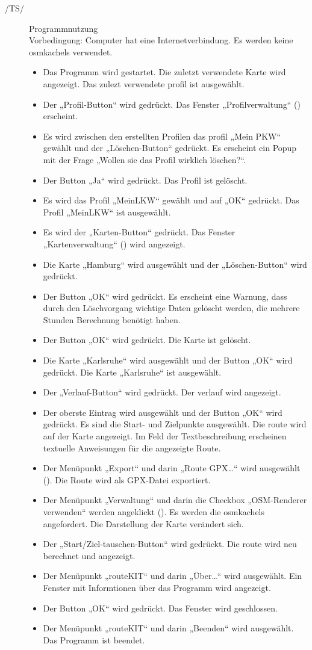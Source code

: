\documentclass[a4paper, 11pt]{article}
\makeatletter
\def\namedlabel#1#2{\begingroup
    #2%
    \def\@currentlabel{#2}%
    \phantomsection\label{#1}\endgroup
}
\newcommand{\oitem}[2]{
  \@ifundefined{c@oitem#1}{\newcounter{oitem#1}}{} %
  \addtocounter{oitem#1}{10}
  \item[\namedlabel{#1:#2}{/#1\arabic{oitem#1}/}]
}
\makeatother
\begin{document}
\begin{description}
\oitem{TS}{programmnutzung} Programmnutzung\\
Vorbedingung: Computer hat eine Internetverbindung. Es werden keine  \glspl{osmkachel} verwendet.
\begin{itemize}
\item Das Programm \routeKIT wird gestartet. Die zuletzt verwendete Karte wird angezeigt. Das zulezt verwendete \gls{profil} ist ausgewählt. 
\item Der „Profil-Button“ wird gedrückt. Das Fenster „Profilverwaltung“  () erscheint.
\item Es wird zwischen den erstellten Profilen das \gls{profil} „Mein PKW“ gewählt und der „Löschen-Button“ gedrückt. Es erscheint ein Popup mit der Frage „Wollen sie das Profil wirklich löschen?“.
\item Der Button „Ja“ wird gedrückt. Das Profil ist gelöscht.
\item Es wird das Profil „MeinLKW“ gewählt und auf „OK“ gedrückt. Das Profil „MeinLKW“ ist ausgewählt. 
\item Es wird der „Karten-Button“ gedrückt. Das Fenster „Kartenverwaltung“ () wird angezeigt.
\item Die Karte „Hamburg“ wird ausgewählt und der „Löschen-Button“ wird gedrückt.
\item Der Button „OK“ wird gedrückt. Es erscheint eine Warnung, dass durch den Löschvorgang wichtige Daten gelöscht werden, die mehrere Stunden Berechnung benötigt haben.
\item Der Button „OK“ wird gedrückt. Die Karte ist gelöscht.
\item Die Karte „Karlsruhe“ wird ausgewählt  und der Button „OK“ wird gedrückt. Die Karte „Karlsruhe“ ist ausgewählt.
\item Der „Verlauf-Button“ wird gedrückt. Der \gls{verlauf} wird angezeigt.
\item Der oberste Eintrag wird ausgewählt und der Button „OK“ wird gedrückt. Es sind die Start- und Zielpunkte ausgewählt. Die \gls{route} wird auf der Karte angezeigt. Im Feld der Textbeschreibung erscheinen textuelle Anweisungen für die angezeigte Route.
\item Der Menüpunkt „Export“ und darin „Route GPX\ldots“ wird ausgewählt (). Die Route wird als GPX-Datei exportiert.
\item Der Menüpunkt „Verwaltung“ und darin die Checkbox „OSM-Renderer verwenden“ werden angeklickt (). Es werden die \glspl{osmkachel} angefordert. Die Darstellung der Karte verändert sich.
\item Der „Start/Ziel-tauschen-Button“ wird gedrückt. Die \gls{route} wird neu berechnet und angezeigt.
\item Der Menüpunkt „routeKIT“ und darin „Über\ldots“ wird ausgewählt. Ein Fenster mit Informtionen über das Programm wird angezeigt. 
\item Der Button „OK“ wird gedrückt. Das Fenster wird geschlossen.
\item Der Menüpunkt „routeKIT“ und darin „Beenden“ wird ausgewählt. Das Programm ist beendet.
\end{itemize}


\end{description}
\end{document}
